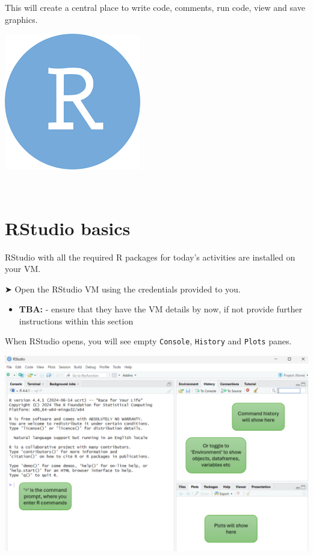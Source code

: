 \documentclass[
]{book}
\providecommand{\tightlist}{%
  \setlength{\itemsep}{0pt}\setlength{\parskip}{0pt}}
\begin{document}
This will create a central place to write code, comments, run code, view and save graphics.

\includegraphics{images/rstudio_logo.png}

~

\hypertarget{rstudio-basics}{%
\section{RStudio basics}\label{rstudio-basics}}

RStudio with all the required R packages for today's activities are installed on your VM.

➤ Open the RStudio VM using the credentials provided to you.

\begin{itemize}
\tightlist
\item
  \textbf{TBA:} - ensure that they have the VM details by now, if not provide further instructions within this section
\end{itemize}

When RStudio opens, you will see empty \texttt{Console}, \texttt{History} and \texttt{Plots} panes.

\includegraphics[width=1\textwidth,height=\textheight]{images/rstudio-default-open.png}
\end{document}

